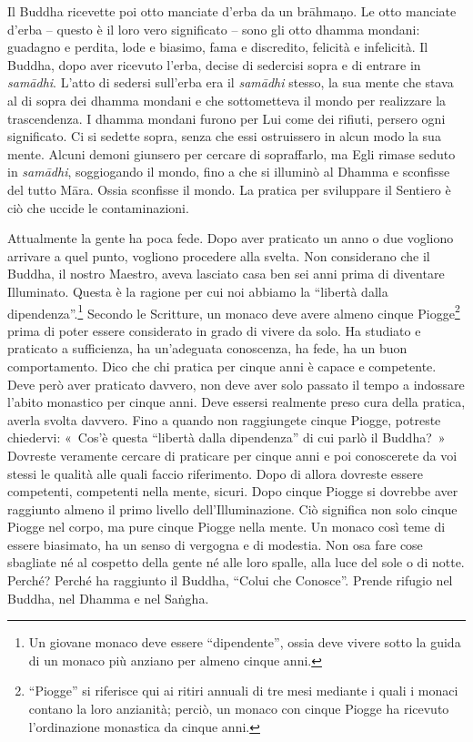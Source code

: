 Il Buddha ricevette poi otto manciate d'erba da un brāhmaṇo. Le otto
manciate d'erba -- questo è il loro vero significato -- sono gli otto
dhamma mondani: guadagno e perdita, lode e biasimo, fama e
discredito, felicità e infelicità. Il Buddha, dopo aver ricevuto l'erba,
decise di sedercisi sopra e di entrare in \emph{samādhi}. L'atto di
sedersi sull'erba era il \emph{samādhi} stesso, la sua mente che stava
al di sopra dei dhamma mondani e che sottometteva il mondo per
realizzare la trascendenza. I dhamma mondani furono per Lui come
dei rifiuti, persero ogni significato. Ci si sedette sopra, senza che
essi ostruissero in alcun modo la sua mente. Alcuni demoni giunsero per
cercare di sopraffarlo, ma Egli rimase seduto in \emph{samādhi},
soggiogando il mondo, fino a che si illuminò al Dhamma e sconfisse del
tutto Māra. Ossia sconfisse il mondo. La pratica per sviluppare il
Sentiero è ciò che uccide le contaminazioni.

Attualmente la gente ha poca fede. Dopo aver praticato un anno o due
vogliono arrivare a quel punto, vogliono procedere alla svelta. Non
considerano che il Buddha, il nostro Maestro, aveva lasciato casa ben
sei anni prima di diventare Illuminato. Questa è la ragione per cui noi
abbiamo la ``libertà dalla dipendenza''.\footnote{Un giovane monaco deve
  essere ``dipendente'', ossia deve vivere sotto la guida di un monaco
  più anziano per almeno cinque anni.} Secondo le Scritture, un monaco
deve avere almeno cinque Piogge\footnote{``Piogge'' si riferisce qui ai
  ritiri annuali di tre mesi mediante i quali i monaci contano la loro
  anzianità; perciò, un monaco con cinque Piogge ha ricevuto
  l'ordinazione monastica da cinque anni.} prima di poter essere
considerato in grado di vivere da solo. Ha studiato e praticato a
sufficienza, ha un'adeguata conoscenza, ha fede, ha un buon
comportamento. Dico che chi pratica per cinque anni è capace e
competente. Deve però aver praticato davvero, non deve aver solo passato
il tempo a indossare l'abito monastico per cinque anni. Deve essersi
realmente preso cura della pratica, averla svolta davvero. Fino a quando
non raggiungete cinque Piogge, potreste chiedervi: «~Cos'è questa
``libertà dalla dipendenza'' di cui parlò il Buddha?~» Dovreste
veramente cercare di praticare per cinque anni e poi conoscerete da voi
stessi le qualità alle quali faccio riferimento. Dopo di allora dovreste
essere competenti, competenti nella mente, sicuri. Dopo cinque Piogge si
dovrebbe aver raggiunto almeno il primo livello dell'Illuminazione. Ciò
significa non solo cinque Piogge nel corpo, ma pure cinque Piogge nella
mente. Un monaco così teme di essere biasimato, ha un senso di vergogna
e di modestia. Non osa fare cose sbagliate né al cospetto della gente né
alle loro spalle, alla luce del sole o di notte. Perché? Perché ha
raggiunto il Buddha, ``Colui che Conosce''. Prende rifugio nel Buddha,
nel Dhamma e nel Saṅgha.


